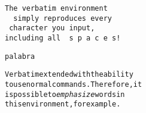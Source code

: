 \begin{verbatim}
The verbatim environment
  simply reproduces every
 character you input,
including all  s p a c e s!
\end{verbatim}

\verb+palabra+


\begin{alltt}
Verbatim extended with the ability
to use normal commands.  Therefore, it
is possible to \emph{emphasize} words in
this environment, for example.
\end{alltt}
